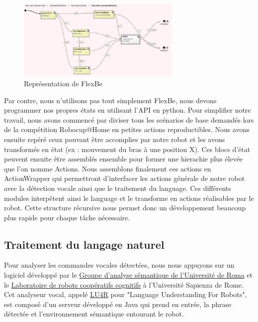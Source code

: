 \documentclass[runningheads,a4paper]{llncs}
\begin{document}
\begin{figure}[h!]
	\centering
	\includegraphics[width=0.70\textwidth]{images/flexbe.png}
	\caption{Représentation de FlexBe}
\end{figure}

Par contre, nous n'utilisons pas tout simplement FlexBe, nous devons programmer nos propres états en utilisant l'API en python. Pour simplifier notre travail, nous avons commencé par diviser tous les scénarios de base demandés lors de la compétition Robocup@Home en petites actions reproductibles. Nous avons ensuite repéré ceux pouvant être accomplies par notre robot et les avons transformés en état (ex : mouvement du bras à une position X). Ces blocs d'état peuvent ensuite être assemblés ensemble pour former une hierachie plus élevée que l'on nomme Actions. Nous assemblons finalement ces actions en ActionWrapper qui permettront d'interfacer les actions générale de notre robot avec la détection vocale ainsi que le traitement du language. Ces différents modules interpêtent ainsi le language et le transforme en actions réalisables par le robot. Cette structure récursive nous permet donc un développement beaucoup plus rapide pour chaque tâche nécessaire. \\

\subsection{Traitement du langage naturel}

Pour analyser les commandes vocales détectées, nous nous appuyons sur un logiciel développé par le \href{http://sag.art.uniroma2.it/}{Groupe d'analyse sémantique de l'Université de Roma} et le \href{http://labrococo.dis.uniroma1.it /}{Laboratoire de robots coopératifs cognitifs} à l'Université Sapienza de Rome. Cet analyseur vocal, appelé \href{http://sag.art.uniroma2.it/lu4r.html}{LU4R} \cite{lu4r} pour "Language Understanding For Robots", est composé d'un serveur développé en Java qui prend en entrée, la phrase détectée et l'environnement sémantique entourant le robot. \\
\end{document}

